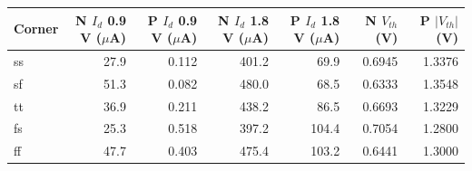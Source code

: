 \begin{tabular}{lrrrrrr}\toprule
Corner & N $I_d$ 0.9 V ($\mu$A) & P $I_d$ 0.9 V ($\mu$A) & N $I_d$ 1.8 V ($\mu$A) & P $I_d$ 1.8 V ($\mu$A) & N $V_{th}$ (V) & P $|V_{th}|$ (V) \\\midrule
ss & 27.9 & 0.112 & 401.2 & 69.9 & 0.6945 & 1.3376 \\
sf & 51.3 & 0.082 & 480.0 & 68.5 & 0.6333 & 1.3548 \\
tt & 36.9 & 0.211 & 438.2 & 86.5 & 0.6693 & 1.3229 \\
fs & 25.3 & 0.518 & 397.2 & 104.4 & 0.7054 & 1.2800 \\
ff & 47.7 & 0.403 & 475.4 & 103.2 & 0.6441 & 1.3000 \\
\bottomrule\end{tabular}